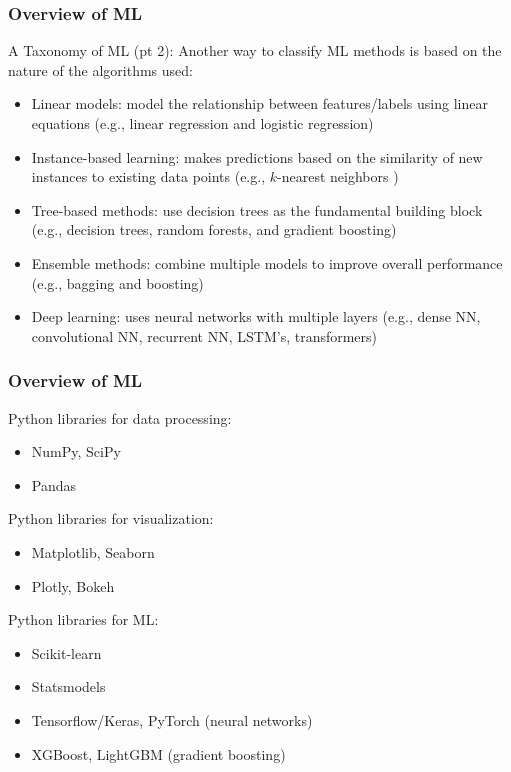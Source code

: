 \documentclass{beamer}
\begin{document}
\begin{frame}	
	\frametitle{Overview of ML}
	
	\begin{block}{A Taxonomy of ML (pt 2):}
		\footnotesize
		Another way to classify ML methods is based on the nature of the algorithms used:
		\begin{itemize}%
			\item Linear models: model the relationship between features/labels using linear equations (e.g., linear regression and logistic regression)
			\item Instance-based learning: makes predictions based on the similarity of new instances to existing data points (e.g., $k$-nearest neighbors )
			\item Tree-based methods: use decision trees as the fundamental building block (e.g., decision trees, random forests, and gradient boosting)
			\item Ensemble methods: combine multiple models to improve overall performance (e.g., bagging and boosting)
			\item Deep learning: uses neural networks with multiple layers (e.g., dense NN, convolutional NN, recurrent NN, LSTM's, transformers)
		\end{itemize}
	\end{block}
\end{frame}


\begin{frame}	
	\frametitle{Overview of ML}
	
	\begin{block}{Python libraries for data processing:}
		\begin{itemize}%
			\item NumPy, SciPy
			\item Pandas
		\end{itemize}
	\end{block}
	
	\begin{block}{Python libraries for visualization:}
		\begin{itemize}%
			\item Matplotlib, Seaborn
			\item Plotly, Bokeh
		\end{itemize}
	\end{block}
	
	\begin{block}{Python libraries for ML:}
		\begin{itemize}%
			\item Scikit-learn
			\item Statsmodels
			\item Tensorflow/Keras, PyTorch (neural networks)
			\item XGBoost, LightGBM (gradient boosting)
		\end{itemize}
	\end{block}
	
\end{frame}
\end{document}
